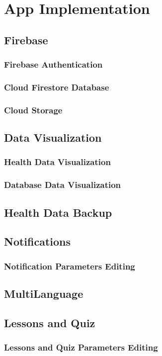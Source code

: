 \section{App Implementation}
\subsection{Firebase}
\subsubsection{Firebase Authentication}
\subsubsection{Cloud Firestore Database}
\subsubsection{Cloud Storage}

\subsection{Data Visualization}
\subsubsection{Health Data Visualization}
\subsubsection{Database Data Visualization}

\subsection{Health Data Backup}
\subsection{Notifications}
\subsubsection{Notification Parameters Editing}
\subsection{MultiLanguage}
\subsection{Lessons and Quiz}
\subsubsection{Lessons and Quiz Parameters Editing}
\newpage